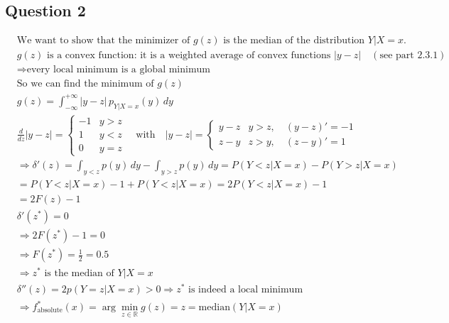 \documentclass[11pt,a4paper]{article}
\theoremstyle{definition}
\theoremstyle{remark}
\begin{document}
\subsection{Question 2}
\begin{align*}
&\text{We want to show that the minimizer of } g(z) \text{ is the median of the distribution } Y|X=x. \\[6pt]
& g(z) \text{ is a convex function: it is a weighted average of convex functions } |y-z| \quad (\text{see part 2.3.1}) \\[6pt]
&\Rightarrow \text{every local minimum is a global minimum} \\[6pt]
&\text{So we can find the minimum of } g(z) \\[6pt]
& g(z) = \int_{-\infty}^{+\infty} |y-z|\, p_{Y|X=x}(y) \, dy \\[6pt]
&\frac{d}{dz} |y-z| = \begin{cases}
-1 & y > z \\
1 & y < z \\
0 & y = z
\end{cases} \quad \text{with} \quad |y-z| = \begin{cases}
y - z & y > z, \quad (y-z)' = -1 \\
z - y & z > y, \quad (z-y)' = 1
\end{cases} \\[12pt]
&\Rightarrow \delta'(z) = \int_{y < z} p(y) \, dy - \int_{y > z} p(y) \, dy = P(Y < z | X = x) - P(Y > z | X = x) \\[6pt]
&= P(Y < z | X = x) - 1 + P(Y < z | X = x) = 2 P(Y < z | X = x) - 1 \\[6pt]
&= 2 F(z) - 1 \\[6pt]
&\delta'(z^*) = 0 \\[6pt]
&\Rightarrow 2 F(z^*) - 1 = 0 \\[6pt]
&\Rightarrow F(z^*) = \frac{1}{2} = 0.5 \\[6pt]
&\Rightarrow z^* \text{ is the median of } Y|X=x \\[6pt]
&\delta''(z) = 2 p(Y = z | X = x) > 0 \Rightarrow z^* \text{ is indeed a local minimum} \\[6pt]
&\Rightarrow f_{\text{absolute}}^*(x) = \arg \min_{z \in \mathbb{R}} g(z) = z = \text{median}(Y|X=x)
\end{align*}
\end{document}
